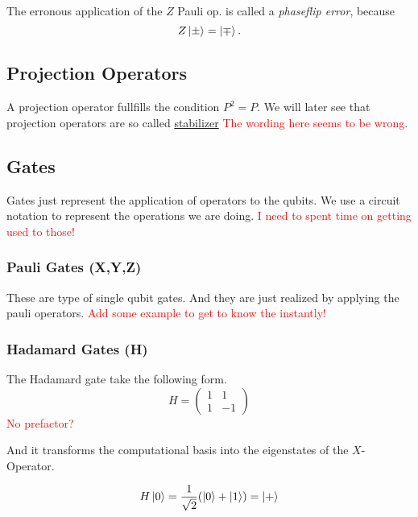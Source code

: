 The erronous application of the $Z$ Pauli op. is called a \textit{phaseflip error}, because 
\begin{equation}
    Z \ket{\pm} = \ket{\mp}.
\end{equation}


\subsection{Projection Operators}\label{sec:basic.math.projection_operator}
A projection operator fullfills the condition $P^2=P$.
We will later see that projection operators are so called \hyperref[sec:basic.qc.stabilizer]{stabilizer}
\textcolor{red}{The wording here seems to be wrong}.


\subsection{Gates}\label{sec:basic.math.gates}
Gates just represent the application of operators to the qubits. 
We use a circuit notation to represent the operations we are doing.
\textcolor{red}{I need to spent time on getting used to those!}


\subsubsection{Pauli Gates (X,Y,Z)}\label{sec:basic.math.gates.paui}
These are type of single qubit gates. And they are just realized by applying the pauli operators. 
\textcolor{red}{Add some example to get to know the instantly!}


\subsubsection{Hadamard Gates (H)}\label{sec:basic.math.gates.hadamard}
The Hadamard gate take the following form.
\begin{equation}
H=    
\begin{pmatrix}
1 & 1  \\
1 & -1  
\end{pmatrix}
\end{equation}
\textcolor{red}{No prefactor?}

And it transforms the computational basis into the eigenstates of the $X$-Operator.

\begin{equation}
    H\ket{0} = \frac{1}{\sqrt{2}} (\ket{0} + \ket{1}) = \ket{+}
\end{equation}

